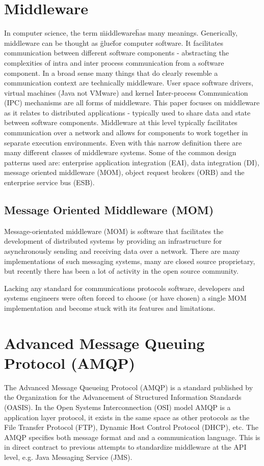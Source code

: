 \documentclass{thesis}
\begin{document}
\section{Middleware}
In computer science, the term \"middleware\" has many meanings.  Generically, middleware can be thought as \"glue\"  for computer software.  It facilitates communication between different software components - abstracting the complexities of intra and inter process communication from a software component.  In a broad sense many things that do clearly resemble a communication context are technically middleware.  User space software drivers, virtual machines (Java not VMware) and kernel Inter-process Communication (IPC) mechanisms are all forms of middleware.  This paper focuses on middleware as it relates to distributed applications - typically used to share data and state between software components.  Middleware at this level typically facilitates communication over a network and allows for components to work together in separate execution environments.  Even with this narrow definition there are many different classes of middleware systems.  Some of the common design patterns used are: enterprise application integration (EAI), data integration (DI), message oriented middleware (MOM), object request brokers (ORB) and the enterprise service bus (ESB).  

\subsection{Message Oriented Middleware (MOM)}
Message-orientated middleware (MOM) is software that facilitates the development of distributed systems by providing an infrastructure for asynchronously sending and receiving data over a network.  There are many implementations of such messaging systems, many are closed source proprietary, but recently there has been a lot of activity in the open source community.  

Lacking any standard for communications protocols software, developers and systems engineers were often forced to choose (or have chosen) a single MOM 
implementation and become stuck with its features and limitations.  

\section{Advanced Message Queuing Protocol (AMQP)}
The Advanced Message Queueing Protocol (AMQP) is a standard published by the Organization for the Advancement of Structured Information Standards (OASIS). %
In the Open Systems Interconnection (OSI) model AMQP is a application layer protocol, it exists in the same space as other protocols as the File Transfer Protocol (FTP), Dynamic Host Control Protocol (DHCP), etc.  %
The AMQP specifies both message format and and a communication language.  This is in direct contract to previous attempts to standardize middleware at the API level, e.g. Java Messaging Service (JMS). %
\end{document}
